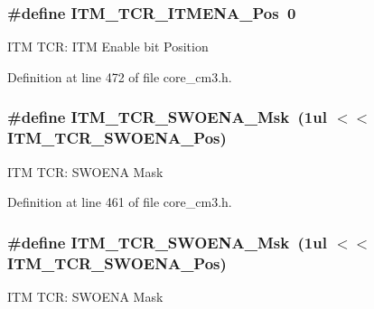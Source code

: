 \subsubsection[{\texorpdfstring{I\+T\+M\+\_\+\+T\+C\+R\+\_\+\+I\+T\+M\+E\+N\+A\+\_\+\+Pos}{ITM_TCR_ITMENA_Pos}}]{\setlength{\rightskip}{0pt plus 5cm}\#define I\+T\+M\+\_\+\+T\+C\+R\+\_\+\+I\+T\+M\+E\+N\+A\+\_\+\+Pos~0}\hypertarget{group___c_m_s_i_s___c_m3___i_t_m_ga3286b86004bce7ffe17ee269f87f8d9d}{}\label{group___c_m_s_i_s___c_m3___i_t_m_ga3286b86004bce7ffe17ee269f87f8d9d}
I\+TM T\+CR\+: I\+TM Enable bit Position 

Definition at line 472 of file core\+\_\+cm3.\+h.

\subsubsection[{\texorpdfstring{I\+T\+M\+\_\+\+T\+C\+R\+\_\+\+S\+W\+O\+E\+N\+A\+\_\+\+Msk}{ITM_TCR_SWOENA_Msk}}]{\setlength{\rightskip}{0pt plus 5cm}\#define I\+T\+M\+\_\+\+T\+C\+R\+\_\+\+S\+W\+O\+E\+N\+A\+\_\+\+Msk~(1ul $<$$<$ I\+T\+M\+\_\+\+T\+C\+R\+\_\+\+S\+W\+O\+E\+N\+A\+\_\+\+Pos)}\hypertarget{group___c_m_s_i_s___c_m3___i_t_m_ga97476cb65bab16a328b35f81fd02010a}{}\label{group___c_m_s_i_s___c_m3___i_t_m_ga97476cb65bab16a328b35f81fd02010a}
I\+TM T\+CR\+: S\+W\+O\+E\+NA Mask 

Definition at line 461 of file core\+\_\+cm3.\+h.

\subsubsection[{\texorpdfstring{I\+T\+M\+\_\+\+T\+C\+R\+\_\+\+S\+W\+O\+E\+N\+A\+\_\+\+Msk}{ITM_TCR_SWOENA_Msk}}]{\setlength{\rightskip}{0pt plus 5cm}\#define I\+T\+M\+\_\+\+T\+C\+R\+\_\+\+S\+W\+O\+E\+N\+A\+\_\+\+Msk~(1ul $<$$<$ I\+T\+M\+\_\+\+T\+C\+R\+\_\+\+S\+W\+O\+E\+N\+A\+\_\+\+Pos)}\hypertarget{group___c_m_s_i_s___c_m3___i_t_m_ga97476cb65bab16a328b35f81fd02010a}{}\label{group___c_m_s_i_s___c_m3___i_t_m_ga97476cb65bab16a328b35f81fd02010a}
I\+TM T\+CR\+: S\+W\+O\+E\+NA Mask 

